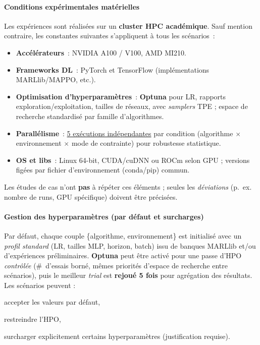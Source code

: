 \paragraph{Conditions expérimentales matérielles}
\label{par:compute_conditions}
Les expériences sont réalisées sur un \textbf{cluster HPC académique}. Sauf mention contraire, les constantes suivantes s’appliquent à tous les scénarios~:
\begin{itemize}
  \item \textbf{Accélérateurs}~: NVIDIA A100 / V100, AMD MI210.
  \item \textbf{Frameworks DL}~: PyTorch et TensorFlow (implémentations MARLlib/MAPPO, etc.).
  \item \textbf{Optimisation d’hyperparamètres}~: \textbf{Optuna} pour LR, rapports exploration/exploitation, tailles de réseaux, avec \textit{samplers} TPE ; espace de recherche standardisé par famille d’algorithmes.
  \item \textbf{Parallélisme}~: \underline{5 exécutions indépendantes} par condition (algorithme $\times$ environnement $\times$ mode de contrainte) pour robustesse statistique.
  \item \textbf{OS et libs}~: Linux 64-bit, CUDA/cuDNN ou ROCm selon GPU ; versions figées par fichier d’environnement (conda/pip) commun.
\end{itemize}
Les études de cas n’ont \textbf{pas} à répéter ces éléments ; seules les \textit{déviations} (p.~ex. nombre de runs, GPU spécifique) doivent être précisées.

\paragraph{Gestion des hyperparamètres (par défaut et surcharges)}
Par défaut, chaque couple \{algorithme, environnement\} est initialisé avec un \textit{profil standard} (LR, tailles MLP, horizon, batch) issu de banques MARLlib et/ou d’expériences préliminaires. \textbf{Optuna} peut être activé pour une passe d’HPO \textit{contrôlée} (\#~d’essais borné, mêmes priorités d’espace de recherche entre scénarios), puis le meilleur \textit{trial} est \textbf{rejoué 5 fois} pour agrégation des résultats. Les scénarios peuvent :
\begin{enumerate*}[label=\alph*)]
  \item accepter les valeurs par défaut,
  \item restreindre l’HPO,
  \item surcharger explicitement certains hyperparamètres (justification requise).
\end{enumerate*}


